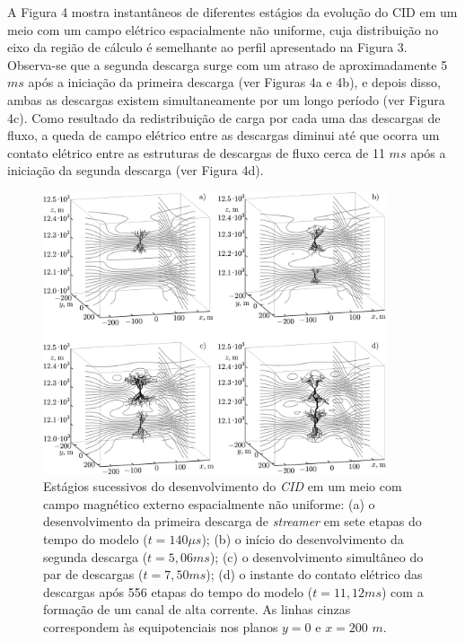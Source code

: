 \documentclass[a4paper, 12pt, onecolumn,singlespacing]{article}
\begin{document}
\begin{figure}
\begin{minipage}{0.5\textwidth}
		\end{minipage}
	\end{figure}
	
	A Figura 4 mostra instantâneos de diferentes estágios da evolução do CID em um meio com um campo elétrico espacialmente não uniforme, cuja distribuição no eixo da região de cálculo é semelhante ao perfil apresentado na Figura 3. Observa-se que a segunda descarga surge com um atraso de aproximadamente 5 $ms$ após a iniciação da primeira descarga (ver Figuras 4a e 4b), e depois disso, ambas as descargas existem simultaneamente por um longo período (ver Figura 4c). Como resultado da redistribuição de carga por cada uma das descargas de fluxo, a queda de campo elétrico entre as descargas diminui até que ocorra um contato elétrico entre as estruturas de descargas de fluxo cerca de 11 $ms$ após a iniciação da segunda descarga (ver Figura 4d).
	
	\begin{figure}[!h]
		\centering
		\includegraphics[width=0.9\textwidth]{imagens/14.png}
		\caption{Estágios sucessivos do desenvolvimento do \textit{CID} em um meio com campo magnético externo espacialmente não uniforme: (a) o desenvolvimento da primeira descarga de \textit{streamer} em sete etapas do tempo do modelo ($t = 140 \mu s$); (b) o início do desenvolvimento da segunda descarga ($t = 5,06 ms$); (c) o desenvolvimento simultâneo do par de descargas ($t = 7,50 ms$); (d) o instante do contato elétrico das descargas após 556 etapas do tempo do modelo ($t = 11,12 ms$) com a formação de um canal de alta corrente. As linhas cinzas correspondem às equipotenciais nos planos $y = 0$ e $x = 200$ $m$.}
		\label{fig:desenvolvimento_passo_a_passo_CID}
	\end{figure}
	
\end{document}
